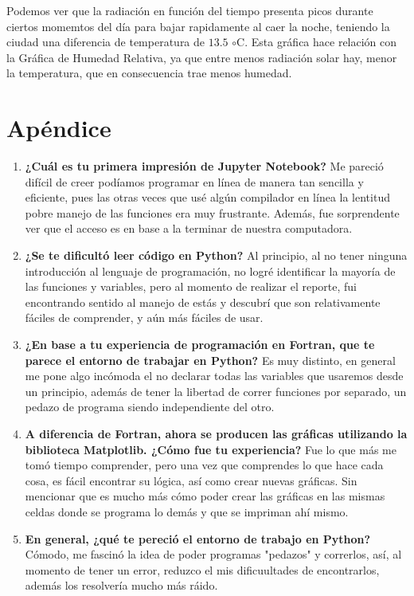 \documentclass{article}
\begin{document}
    Podemos ver que la radiación en función del tiempo presenta picos durante ciertos momemtos del día para bajar rapidamente al caer la noche, teniendo la ciudad una diferencia de temperatura de $13.5$ $\circ$C. Esta gráfica hace relación con la Gráfica de Humedad Relativa, ya que entre menos radiación solar hay, menor la temperatura, que en consecuencia trae menos humedad.

\section{Apéndice}
\begin{enumerate}
\item \textbf{¿Cuál es tu primera impresión de Jupyter Notebook?}
Me pareció difícil de creer podíamos programar en línea de manera tan sencilla y eficiente, pues las otras veces que usé algún compilador en línea la lentitud pobre manejo de las funciones era muy frustrante. Además, fue sorprendente ver que el acceso es en base a la terminar de nuestra computadora.

\item \textbf{¿Se te dificultó leer código en Python?}
Al principio, al no tener ninguna introducción al lenguaje de programación, no logré identificar la mayoría de las funciones y variables, pero al momento de realizar el reporte, fui encontrando sentido al manejo de estás y descubrí que son relativamente fáciles de comprender, y aún más fáciles de usar.

\item \textbf{¿En base a tu experiencia de programación en Fortran, que te parece el entorno de trabajar en Python?}
Es muy distinto, en general me pone algo incómoda el no declarar todas las variables que usaremos desde un principio, además de tener la libertad de correr funciones por separado, un pedazo de programa siendo independiente del otro. 

\item \textbf{A diferencia de Fortran, ahora se producen las gráficas utilizando la biblioteca Matplotlib. ¿Cómo fue tu experiencia?}
Fue lo que más me tomó tiempo comprender, pero una vez que comprendes lo que hace cada cosa, es fácil encontrar su lógica, así como crear nuevas gráficas. Sin mencionar que es mucho más cómo poder crear las gráficas en las mismas celdas donde se programa lo demás y que se impriman ahí mismo.

\item \textbf{En general, ¿qué te pereció el entorno de trabajo en Python?}
Cómodo, me fascinó la idea de poder programas "pedazos" y correrlos, así, al momento de tener un error, reduzco el mis dificuultades de encontrarlos, además los resolvería mucho más ráido.


\end{enumerate}
\end{document}

